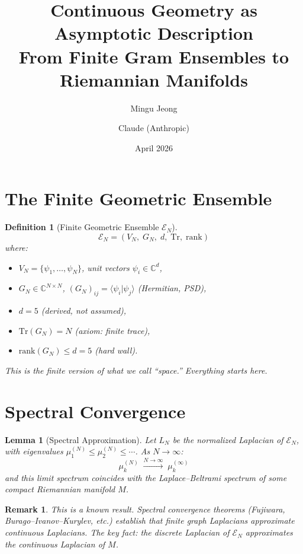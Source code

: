 \documentclass[11pt]{article}
\title{Continuous Geometry as Asymptotic Description\\
  {\large From Finite Gram Ensembles to Riemannian Manifolds}}
\author{Mingu Jeong \and Claude (Anthropic)}
\date{April 2026}
\newtheorem{definition}[theorem]{Definition}
\newtheorem{lemma}[theorem]{Lemma}
\newtheorem{remark}[theorem]{Remark}
\begin{document}
\maketitle

\section{The Finite Geometric Ensemble}

\begin{definition}[Finite Geometric Ensemble $\mathcal{E}_N$]
\[
  \mathcal{E}_N = (V_N,\; G_N,\; d,\; \mathrm{Tr},\; \mathrm{rank})
\]
where:
\begin{itemize}
  \item $V_N = \{\psi_1, \ldots, \psi_N\}$, unit vectors $\psi_i \in \mathbb{C}^d$,
  \item $G_N \in \mathbb{C}^{N \times N}$, $(G_N)_{ij} = \langle \psi_i | \psi_j \rangle$
    (Hermitian, PSD),
  \item $d = 5$ (derived, not assumed),
  \item $\mathrm{Tr}(G_N) = N$ (axiom: finite trace),
  \item $\mathrm{rank}(G_N) \leq d = 5$ (hard wall).
\end{itemize}
This is the finite version of what we call ``space.''
Everything starts here.
\end{definition}

\section{Spectral Convergence}

\begin{lemma}[Spectral Approximation]\label{lem:spectral}
Let $L_N$ be the normalized Laplacian of $\mathcal{E}_N$, with
eigenvalues $\mu_1^{(N)} \leq \mu_2^{(N)} \leq \cdots$.
As $N \to \infty$:
\[
  \mu_k^{(N)} \;\xrightarrow{N \to \infty}\; \mu_k^{(\infty)}
\]
and this limit spectrum coincides with the Laplace--Beltrami
spectrum of some compact Riemannian manifold $M$.
\end{lemma}

\begin{remark}
This is a known result. Spectral convergence theorems
(Fujiwara, Burago--Ivanov--Kurylev, etc.) establish that
finite graph Laplacians approximate continuous Laplacians.
The key fact: the discrete Laplacian of $\mathcal{E}_N$
approximates the continuous Laplacian of $M$.
\end{remark}
\end{document}
